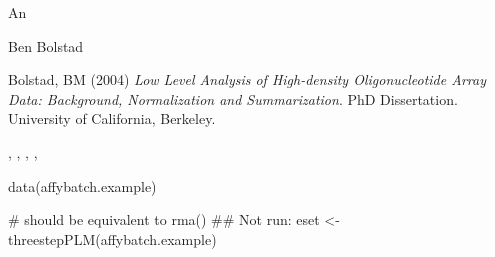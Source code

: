 \begin{Value}
An 
\end{Value}
\begin{Author}\relax
Ben Bolstad 
\end{Author}
\begin{References}\relax
Bolstad, BM (2004) \emph{Low Level Analysis of High-density
Oligonucleotide Array Data: Background, Normalization and
Summarization}. PhD Dissertation. University of California,
Berkeley.
\end{References}
\begin{SeeAlso}\relax
{},
, ,
, 
\end{SeeAlso}
\begin{Examples}
\begin{ExampleCode}
data(affybatch.example)

# should be equivalent to rma()
## Not run: eset <- threestepPLM(affybatch.example)
\end{ExampleCode}
\end{Examples}

